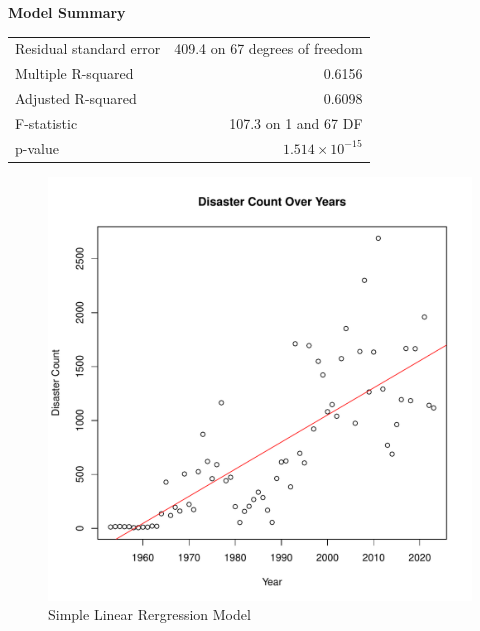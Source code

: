 \documentclass[12pt]{report}\usepackage[]{graphicx}\usepackage[]{xcolor}
\makeatletter
\def\maxwidth{ %
  \ifdim\Gin@nat@width>\linewidth
    \linewidth
  \else
    \Gin@nat@width
  \fi
}
\newenvironment{knitrout}{}{} %
\makeatother
\begin{document}
\begin{center}
\textbf{Model Summary}
\end{center}
\begin{center}
\begin{tabular}{lr}
\toprule
Residual standard error & 409.4 on 67 degrees of freedom \\
Multiple R-squared      & 0.6156 \\
Adjusted R-squared      & 0.6098 \\
F-statistic             & 107.3 on 1 and 67 DF \\
p-value                 & $1.514 \times 10^{-15}$ \\
\bottomrule
\end{tabular}
\end{center}
\begin{figure}[h!]
\centering
  \begin{minipage}{.8\linewidth}
\begin{knitrout}
\color{fgcolor}
\includegraphics[width=\maxwidth]{figure/plot_data_points-1} 
\end{knitrout}
  \caption{Simple Linear Rergression Model}
  \label{figure:2}
  \end{minipage}
\end{figure}
\end{document}

